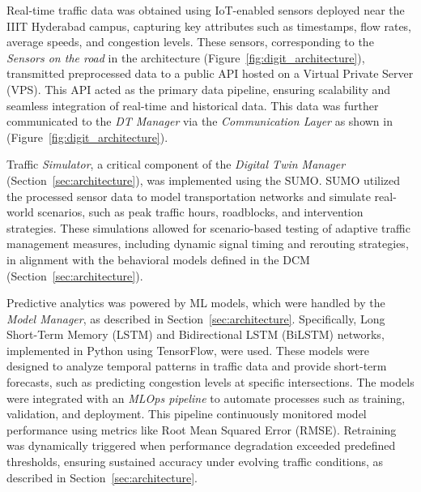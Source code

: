 Real-time traffic data was obtained using IoT-enabled sensors deployed near the IIIT Hyderabad campus, capturing key attributes such as timestamps, flow rates, average speeds, and congestion levels. These sensors, corresponding to the \textit{Sensors on the road} in the architecture (Figure~\ref{fig:digit_architecture}), transmitted preprocessed data to a public API hosted on a Virtual Private Server (VPS). This API acted as the primary data pipeline, ensuring scalability and seamless integration of real-time and historical data. This data was further communicated to the \textit{DT Manager} via the \textit{Communication Layer} as shown in (Figure~\ref{fig:digit_architecture}).

Traffic \textit{Simulator}, a critical component of the \textit{Digital Twin Manager} (Section~\ref{sec:architecture}), was implemented using the SUMO. SUMO utilized the processed sensor data to model transportation networks and simulate real-world scenarios, such as peak traffic hours, roadblocks, and intervention strategies. These simulations allowed for scenario-based testing of adaptive traffic management measures, including dynamic signal timing and rerouting strategies, in alignment with the behavioral models defined in the DCM (Section~\ref{sec:architecture}).

Predictive analytics was powered by ML models, which were handled by the \textit{Model Manager}, as described in Section~\ref{sec:architecture}. Specifically, Long Short-Term Memory (LSTM) and Bidirectional LSTM (BiLSTM) networks, implemented in Python using TensorFlow, were used. These models were designed to analyze temporal patterns in traffic data and provide short-term forecasts, such as predicting congestion levels at specific intersections. The models were integrated with an \textit{MLOps pipeline} to automate processes such as training, validation, and deployment. This pipeline continuously monitored model performance using metrics like Root Mean Squared Error (RMSE). Retraining was dynamically triggered when performance degradation exceeded predefined thresholds, ensuring sustained accuracy under evolving traffic conditions, as described in Section~\ref{sec:architecture}.


